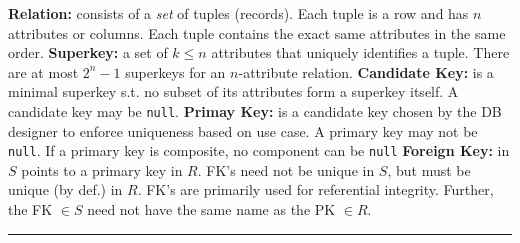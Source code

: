 \documentclass{report}
\renewcommand{\bf}[1]{\textbf{{#1}}}
\renewcommand{\tt}[1]{\texttt{{#1}}}
\renewcommand{\it}[1]{\textit{{#1}}}
\begin{document}
\thispagestyle{name}
\bf{Relation:} consists of a \it{set} of tuples (records). Each tuple is a row and has $n$
attributes or columns. Each tuple contains the exact same attributes in the same order.
\hfil \newline
\bf{Superkey:} a set of $k \leq n$ attributes that uniquely identifies a tuple. There are at most
$2^n - 1$ superkeys for an $n$-attribute relation.
\hfil \newline
\bf{Candidate Key:} is a minimal superkey s.t. no subset of its attributes form a superkey itself.
A candidate key may be \tt{null}.
\hfil \newline
\bf{Primay Key:} is a candidate key chosen by the DB designer to enforce uniqueness based on use
case. A primary key may not be \tt{null}. If a primary key is composite, no component can be 
\tt{null}
\hfil \newline
\bf{Foreign Key:} in $S$ points to a primary key in $R$. FK's need not be unique in $S$, but must
be unique (by def.) in $R$. FK's are primarily used for referential integrity. Further, the FK
$\in S$ need not have the same name as the PK $\in R$.
\hfil \newline
\vspace{-0.8em}
\hrule
\vspace{0.2em}
\end{document}
